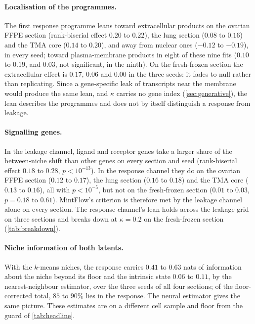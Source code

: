\paragraph{Localisation of the programmes.} The first response programme leans toward extracellular products on the ovarian FFPE section (rank-biserial effect $0.20$ to $0.22$), the lung section ($0.08$ to $0.16$) and the TMA core ($0.14$ to $0.20$), and away from nuclear ones ($-0.12$ to $-0.19$), in every seed; toward plasma-membrane products in eight of these nine fits ($0.10$ to $0.19$, and $0.03$, not significant, in the ninth). On the fresh-frozen section the extracellular effect is $0.17$, $0.06$ and $0.00$ in the three seeds: it fades to null rather than replicating. Since a gene-specific leak of transcripts near the membrane would produce the same lean, and $\kappa$ carries no gene index (\cref{sec:generative}), the lean describes the programmes and does not by itself distinguish a response from leakage.

\paragraph{Signalling genes.} In the leakage channel, ligand and receptor genes take a larger share of the between-niche shift than other genes on every section and seed (rank-biserial effect $0.18$ to $0.28$, $p < 10^{-13}$). In the response channel they do on the ovarian FFPE section ($0.12$ to $0.17$), the lung section ($0.16$ to $0.18$) and the TMA core ($0.13$ to $0.16$), all with $p < 10^{-5}$, but not on the fresh-frozen section ($0.01$ to $0.03$, $p = 0.18$ to $0.61$). MintFlow's criterion is therefore met by the leakage channel alone on every section. The response channel's lean holds across the leakage grid on three sections and breaks down at $\kappa = 0.2$ on the fresh-frozen section (\cref{tab:breakdown}).

\paragraph{Niche information of both latents.} With the $k$-means niches, the response carries $0.41$ to $0.63$ nats of information about the niche beyond its floor and the intrinsic state $0.06$ to $0.11$, by the nearest-neighbour estimator, over the three seeds of all four sections; of the floor-corrected total, $85$ to $90\%$ lies in the response. The neural estimator gives the same picture. These estimates are on a different cell sample and floor from the guard of \cref{tab:headline}.

